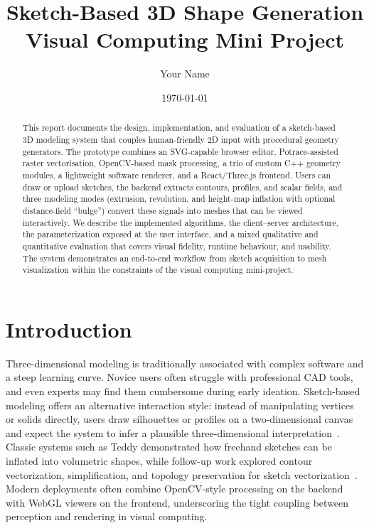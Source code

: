 \documentclass[11pt, a4paper]{article}
\title{Sketch-Based 3D Shape Generation\\
\large Visual Computing Mini Project}
\author{Your Name}
\date{\today}
\begin{document}
\maketitle

\begin{abstract}
This report documents the design, implementation, and evaluation of a sketch-based 3D modeling system that couples human-friendly 2D input with procedural geometry generators. The prototype combines an SVG-capable browser editor, Potrace-assisted raster vectorisation, OpenCV-based mask processing, a trio of custom C++ geometry modules, a lightweight software renderer, and a React/Three.js frontend. Users can draw or upload sketches, the backend extracts contours, profiles, and scalar fields, and three modeling modes (extrusion, revolution, and height-map inflation with optional distance-field ``bulge'') convert these signals into meshes that can be viewed interactively. We describe the implemented algorithms, the client--server architecture, the parameterization exposed at the user interface, and a mixed qualitative and quantitative evaluation that covers visual fidelity, runtime behaviour, and usability. The system demonstrates an end-to-end workflow from sketch acquisition to mesh visualization within the constraints of the visual computing mini-project.
\end{abstract}

\section{Introduction}
Three-dimensional modeling is traditionally associated with complex software and a steep learning curve. Novice users often struggle with professional CAD tools, and even experts may find them cumbersome during early ideation. Sketch-based modeling offers an alternative interaction style: instead of manipulating vertices or solids directly, users draw silhouettes or profiles on a two-dimensional canvas and expect the system to infer a plausible three-dimensional interpretation~\cite{igarashi2023teddy}. Classic systems such as Teddy demonstrated how freehand sketches can be inflated into volumetric shapes, while follow-up work explored contour vectorization, simplification, and topology preservation for sketch vectorization~\cite{shade1998layered,scharstein2002taxonomy}. Modern deployments often combine OpenCV-style processing on the backend with WebGL viewers on the frontend, underscoring the tight coupling between perception and rendering in visual computing.
\end{document}
